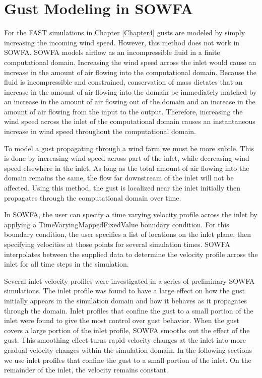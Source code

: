 
\section{Gust Modeling in SOWFA} \label{section6-5}

For the FAST simulations in Chapter \ref{Chapter4} gusts are modeled by simply increasing the incoming wind speed. However, this method does not work in SOWFA. SOWFA models airflow as an incompressible fluid in a finite computational domain. Increasing the wind speed across the inlet would cause an increase in the amount of air flowing into the computational domain. Because the fluid is incompressible and constrained, conservation of mass dictates that an increase in the amount of air flowing into the domain be immediately matched by an increase in the amount of air flowing out of the domain and an increase in the amount of air flowing from the input to the output. Therefore, increasing the wind speed across the inlet of the computational domain causes an instantaneous increase in wind speed throughout the computational domain.

To model a gust propagating through a wind farm we must be more subtle. This is done by increasing wind speed across part of the inlet, while decreasing wind speed elsewhere in the inlet. As long as the total amount of air flowing into the domain remains the same, the flow far downstream of the inlet will not be affected. Using this method, the gust is localized near the inlet initially then propagates through the computational domain over time. 

In SOWFA, the user can specify a time varying velocity profile across the inlet by applying a TimeVaryingMappedFixedValue boundary condition. For this boundary condition, the user specifies a list of locations on the inlet plane, then specifying velocities at those points for several simulation times. SOWFA interpolates between the supplied data to determine the velocity profile across the inlet for all time steps in the simulation.

Several inlet velocity profiles were investigated in a series of preliminary SOWFA simulations. The inlet profile was found to have a large effect on how the gust initially appears in the simulation domain and how it behaves as it propagates through the domain. Inlet profiles that confine the gust to a small portion of the inlet were found to give the most control over gust behavior. When the gust covers a large portion of the inlet profile, SOWFA smooths out the effect of the gust. This smoothing effect turns rapid velocity changes at the inlet into more gradual velocity changes within the simulation domain. In the following sections we use inlet profiles that confine the gust to a small portion of the inlet. On the remainder of the inlet, the velocity remains constant. 

